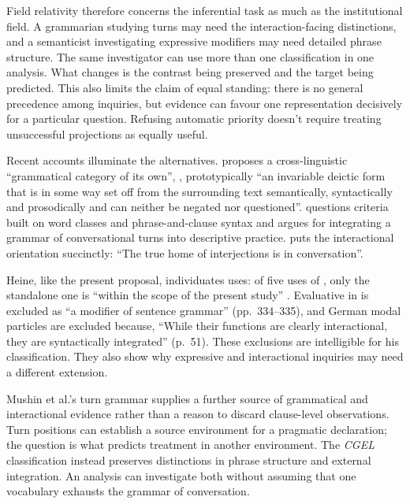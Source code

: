 \documentclass[12pt]{article}
\begin{document}
Field relativity therefore concerns the inferential task as much as the institutional field. A grammarian studying turns may need the interaction-facing distinctions, and a semanticist investigating expressive modifiers may need detailed phrase structure. The same investigator can use more than one classification in one analysis. What changes is the contrast being preserved and the target being predicted. This also limits the claim of equal standing: there is no general precedence among inquiries, but evidence can favour one representation decisively for a particular question. Refusing automatic priority doesn't require treating unsuccessful projections as equally useful.

Recent accounts illuminate the alternatives. \textcite[1, 7--8]{heine2023interactives} proposes a cross-linguistic \enquote{grammatical category of its own}, , prototypically \enquote{an invariable deictic form that is in some way set off from the surrounding text semantically, syntactically and prosodically and can neither be negated nor questioned}. \textcite[159, 164]{mushin2023} questions criteria built on word classes and phrase-and-clause syntax and argues for integrating a grammar of conversational turns into descriptive practice. \textcite[4]{dingemanse2023preprint} puts the interactional orientation succinctly: \enquote{The true home of interjections is in conversation}.

Heine, like the present proposal, individuates uses: of five uses of , only the standalone one is \enquote{within the scope of the present study} \citep[12]{heine2023interactives}. Evaluative  in  is excluded as \enquote{a modifier of sentence grammar} (pp.~334--335), and German modal particles are excluded because, \enquote{While their functions are clearly interactional, they are syntactically integrated} (p.~51). These exclusions are intelligible for his classification. They also show why expressive and interactional inquiries may need a different extension.

Mushin et al.'s turn grammar supplies a further source of grammatical and interactional evidence rather than a reason to discard clause-level observations. Turn positions can establish a source environment for a pragmatic declaration; the question is what predicts treatment in another environment. The \textit{CGEL} classification instead preserves distinctions in phrase structure and external integration. An analysis can investigate both without assuming that one vocabulary exhausts the grammar of conversation.
\end{document}
